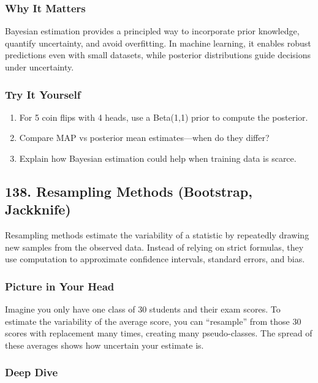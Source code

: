 \documentclass[
  letterpaper,
  DIV=11,
  numbers=noendperiod]{scrreprt}
\providecommand{\tightlist}{%
  \setlength{\itemsep}{0pt}\setlength{\parskip}{0pt}}
\begin{document}
\subsubsection{Why It Matters}\label{why-it-matters-34}

Bayesian estimation provides a principled way to incorporate prior
knowledge, quantify uncertainty, and avoid overfitting. In machine
learning, it enables robust predictions even with small datasets, while
posterior distributions guide decisions under uncertainty.

\subsubsection{Try It Yourself}\label{try-it-yourself-136}

\begin{enumerate}
\def\labelenumi{\arabic{enumi}.}
\tightlist
\item
  For 5 coin flips with 4 heads, use a Beta(1,1) prior to compute the
  posterior.
\item
  Compare MAP vs posterior mean estimates---when do they differ?
\item
  Explain how Bayesian estimation could help when training data is
  scarce.
\end{enumerate}

\subsection{138. Resampling Methods (Bootstrap,
Jackknife)}\label{resampling-methods-bootstrap-jackknife}

Resampling methods estimate the variability of a statistic by repeatedly
drawing new samples from the observed data. Instead of relying on strict
formulas, they use computation to approximate confidence intervals,
standard errors, and bias.

\subsubsection{Picture in Your Head}\label{picture-in-your-head-137}

Imagine you only have one class of 30 students and their exam scores. To
estimate the variability of the average score, you can ``resample'' from
those 30 scores with replacement many times, creating many
pseudo-classes. The spread of these averages shows how uncertain your
estimate is.

\subsubsection{Deep Dive}\label{deep-dive-137}
\end{document}
